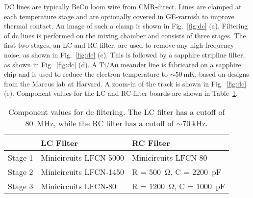 DC lines are typically BeCu loom wire from CMR-direct. Lines are clamped at each temperature stage and are optionally
covered in GE-varnish to improve thermal contact. An image of such a clamp is shown in Fig.~\ref{fig:dc} (a). Filtering
of dc lines is performed on the mixing chamber and consists of three stages. The first two stages, an LC and RC filter,
are used to remove any high-frequency noise, as shown in Fig.~\ref{fig:dc} (c). This is followed by a sapphire stripline
filter, as shown in Fig.~\ref{fig:dc} (d). A Ti/Au meander line is fabricated on a sapphire chip and is used
to reduce the electron temperature to $\sim \SI{50}{\milli\kelvin}$, based on designs from the Marcus lab at Harvard.
A zoom-in of the track is shown in Fig.~\ref{fig:dc} (e). Component values for the LC and RC filter boards are shown in
Table~\ref{tab:filt}.

\begin{table}
    \centering
    \begin{tabular}{lll}
    \toprule
     & LC Filter & RC Filter \\
    \midrule
    Stage 1 & Minicircuits LFCN-5000 & Minicircuits LFCN-80\\
    Stage 2 & Minicircuits LFCN-1450 & R = \SI{500}{\ohm}, C = \SI{2200}{\pico\farad} \\
    Stage 3 & Minicircuits LFCN-80 & R = \SI{1200}{\ohm}, C = \SI{1000}{\pico\farad} \\
    \bottomrule
    \end{tabular}
    \caption[Component values for dc filers]{Component values for dc filtering. The LC filter has a cutoff of \SI{80}{\mega\hertz}, while the RC filter
    has a cutoff of $\sim \SI{70}{\kilo\hertz}$.}
    \label{tab:filt}
  \end{table}
